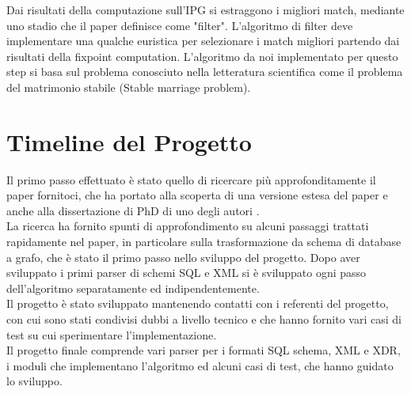 \documentclass{article}
\begin{document}
Dai risultati della computazione sull’IPG si estraggono i migliori match, mediante uno stadio che il paper definisce come "filter". L'algoritmo di filter deve implementare una qualche euristica per selezionare i match migliori partendo dai risultati della fixpoint computation. L'algoritmo da noi implementato per questo step si basa sul problema conosciuto nella letteratura scientifica come il problema del matrimonio stabile (Stable marriage problem).\\


\section{Timeline del Progetto}

Il primo passo effettuato è stato quello di ricercare più approfonditamente il paper fornitoci, che ha portato alla scoperta di una versione estesa del paper \cite{sfpaper_ext} e anche alla dissertazione di PhD di uno degli autori \cite{generic_model_man}.\\

La ricerca ha fornito spunti di approfondimento su alcuni passaggi trattati rapidamente nel paper, in particolare sulla trasformazione da schema di database a grafo, che è stato il primo passo nello sviluppo del progetto.
Dopo aver sviluppato i primi parser di schemi SQL e XML si è sviluppato ogni passo dell’algoritmo separatamente ed indipendentemente.\\

Il progetto è stato sviluppato mantenendo contatti con i referenti del progetto, con cui sono stati condivisi dubbi a livello tecnico e che hanno fornito vari casi di test su cui sperimentare l’implementazione.\\

Il progetto finale comprende vari parser per i formati SQL schema, XML e XDR, i moduli che implementano l’algoritmo ed alcuni casi di test, che hanno guidato lo sviluppo.\\

\end{document}
